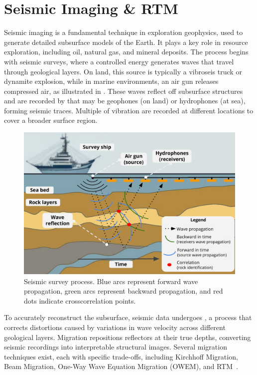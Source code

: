 \documentclass[Ingles,Final]{ic-tese-v3}
\begin{document}
\section{Seismic Imaging \& RTM}
\label{sec:rtm}

Seismic imaging is a fundamental technique in exploration geophysics, used to generate detailed subsurface models of the Earth. It plays a key role in resource exploration, including oil, natural gas, and mineral deposits. The process begins with seismic surveys, where a controlled energy  generates waves that travel through geological layers. On land, this source is typically a vibroseis truck or dynamite explosion, while in marine environments, an air gun releases compressed air, as illustrated in . These waves reflect off subsurface structures and are recorded by  that may be geophones (on land) or hydrophones (at sea), forming seismic traces\cite{haldar2018}. Multiple  of vibration are recorded at different locations to cover a broader surface region.  


\begin{figure}[h]
    \centering
    \includegraphics[width=1\textwidth]{figures/rtm.pdf}
    \caption[Seismic survey]{Seismic survey process. Blue arcs represent forward wave propagation, green arcs represent backward propagation, and red dots indicate crosscorrelation points.}
    \label{fig:rtm}
\end{figure}

To accurately reconstruct the subsurface, seismic data undergoes , a process that corrects distortions caused by variations in wave velocity across different geological layers. Migration repositions reflectors at their true depths, converting seismic recordings into interpretable structural images. Several migration techniques exist, each with specific trade-offs, including Kirchhoff Migration, Beam Migration, One-Way Wave Equation Migration (OWEM), and RTM~\cite{etgen2009}.
\end{document}
